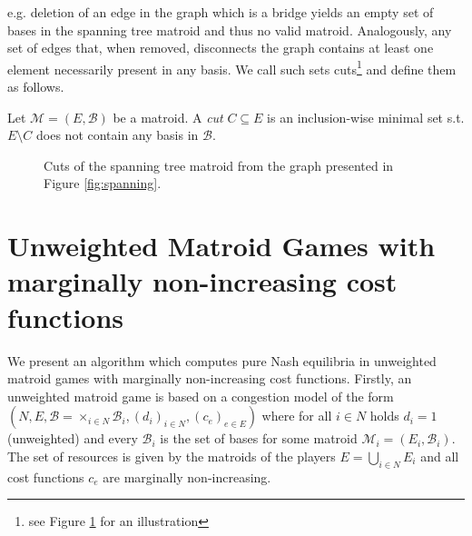 \documentclass{scrartcl}
\theoremstyle{nonumberplain}
\newcommand{\tupel}[1]{\left(#1\right)}
\begin{document}
e.g. deletion of an edge in the graph which is a bridge yields
an empty set of bases in the spanning tree matroid and thus no valid matroid.
Analogously, any set of edges that, when removed, disconnects the graph
contains at least one element necessarily present in any basis. We call such
sets cuts\footnote{see Figure \ref{fig:cuts} for an illustration} and define
them as follows.  \begin{defi}
  Let $\mathcal{M} = \tupel{E, \mathcal{B}}$ be a matroid. A \emph{cut}
  $C\subseteq E$ is an inclusion-wise minimal set s.t. $E\setminus C$ does not
  contain any basis in $\mathcal{B}$.
\end{defi}
\begin{figure}
  \begin{center}
  \end{center}
  \caption{Cuts of the spanning tree matroid from the graph presented in Figure
    \ref{fig:spanning}.}
  \label{fig:cuts}
\end{figure}

\section{Unweighted Matroid Games with marginally non-increasing cost
functions}
We present an algorithm which computes pure Nash equilibria in unweighted
matroid games with marginally non-increasing cost functions. Firstly, an
unweighted matroid game is based on a congestion model of the form
$\tupel{N, E, \mathcal{B} = \times_{i\in N}\mathcal{B}_{i},
(d_{i})_{i\in N}, (c_{e})_{e\in E}}$ where for all $i\in N$ holds $d_{i} = 1$
(unweighted) and every $\mathcal{B}_{i}$ is the set of bases for some matroid
$\mathcal{M}_{i} = \tupel{E_{i}, \mathcal{B}_{i}}$. The set of resources is
given by the matroids of the players $E = \bigcup_{i\in N}E_{i}$ and all cost
functions $c_{e}$ are marginally non-increasing.
\end{document}
